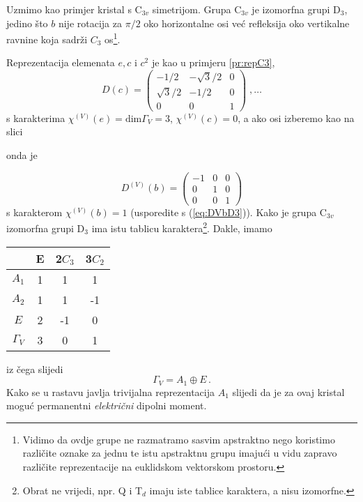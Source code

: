 \centerline{}


Uzmimo kao primjer kristal s C$_{3v}$ simetrijom.
Grupa C$_{3v}$ je izomorfna grupi D$_3$, jedino što $b$ nije rotacija
za $\pi/2$ oko horizontalne osi već refleksija oko vertikalne ravnine
koja sadrži $C_3$ os\footnote{Vidimo da ovdje grupe ne razmatramo sasvim 
apstraktno nego koristimo različite oznake za jednu te istu apstraktnu
grupu imajući u vidu zapravo različite reprezentacije na euklidskom
vektorskom prostoru.}.

Reprezentacija elemenata $e, c$ i  $c^2$ je kao u primjeru \ref{pr:repC3},
\begin{displaymath}
D(c)=
\left(
\begin{array}{ccc}
-1/2 & -\sqrt{3}/2 & 0 \\
\sqrt{3}/2 & -1/2 & 0 \\
0 & 0 & 1
\end{array}\right) \;, \ldots
\end{displaymath}
s karakterima $\chi^{(V)}(e)=\mbox{dim}\Gamma_{V}=3$, $\chi^{(V)}(c)=0$,
a ako osi izberemo kao na slici

\centerline{}

onda je 

\begin{displaymath}
D^{(V)}(b)=
\begin{pmatrix}
-1 & 0 & 0 \\
0 & 1 & 0 \\
0 & 0 & 1
\end{pmatrix}
\end{displaymath}
s karakterom $\chi^{(V)}(b)=1$ (usporedite s (\ref{eq:DVbD3})).
Kako je grupa C$_{3v}$ izomorfna grupi D$_3$ ima istu tablicu karaktera\footnote{Obrat
ne vrijedi, npr. Q i T$_d$ imaju iste tablice karaktera, a nisu izomorfne.}. Dakle,
imamo
\begin{center}
\begin{tabular}{c|ccc}
  & E & 2$C_3$  & 3$C_2$ \\ \hline
$A_1$ & 1 & 1& 1 \\
$A_2$ & 1 & 1&-1 \\
 $E$  & 2 &-1& 0 \\ \hline
 $\Gamma_V$ & 3 & 0 & 1
\end{tabular}
\end{center}

iz čega slijedi
\begin{displaymath}
   \Gamma_{V} = A_1  \oplus E \,.
\end{displaymath}
Kako se u rastavu javlja trivijalna reprezentacija $A_1$  slijedi
da je za ovaj kristal moguć permanentni \emph{električni} dipolni
moment.


